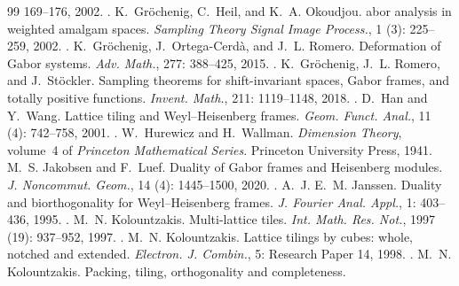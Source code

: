 \documentclass[11pt,reqno]{amsart}
\numberwithin{equation}{section}
\theoremstyle{definition}
\theoremstyle{remark}
\begin{document}
\begin{thebibliography}{99}
  169--176, 2002.
\newblock {}.
K.~Gr\"ochenig, C.~Heil, and K.~A. Okoudjou.
abor analysis in weighted amalgam spaces.
\newblock \emph{Sampling Theory Signal Image Process.}, 1 (3): 225--259, 2002.
\newblock {}.
K.~Gr\"ochenig, J.~Ortega-Cerd\`a, and J.~L. Romero.
\newblock Deformation of {G}abor systems.
\newblock \emph{Adv. Math.}, 277: 388--425, 2015.
\newblock {}.
K.~Gr\"ochenig, J.~L. Romero, and J.~St\"ockler.
\newblock Sampling theorems for shift-invariant spaces, {G}abor frames, and totally positive functions.
\newblock \emph{Invent. Math.}, 211: 1119--1148, 2018.
\newblock {}.
D.~Han and Y.~Wang.
\newblock Lattice tiling and {W}eyl--{H}eisenberg frames.
\newblock \emph{Geom. Funct. Anal.}, 11 (4): 742--758, 2001.
\newblock {}.
W.~Hurewicz and H.~Wallman.
\newblock \emph{Dimension Theory}, volume~4 of \emph{Princeton Mathematical
  Series}.
\newblock Princeton University Press, 1941.
M.~S. Jakobsen and F.~Luef.
\newblock Duality of {G}abor frames and {H}eisenberg modules.
\newblock \emph{J. Noncommut. Geom.}, 14 (4): 1445--1500,
  2020.
\newblock {}.
A.~J. E.~M. Janssen.
\newblock Duality and biorthogonality for {W}eyl--{H}eisenberg frames.
\newblock \emph{J. Fourier Anal. Appl.}, 1: 403--436, 1995.
\newblock {}.
M.~N. Kolountzakis.
\newblock Multi-lattice tiles.
\newblock \emph{Int. Math. Res. Not.}, 1997 (19): 937--952, 1997.
\newblock {}.
M.~N. Kolountzakis.
\newblock Lattice tilings by cubes: whole, notched and extended.
\newblock \emph{Electron. J. Combin.}, 5: Research Paper 14, 1998.
\newblock {}.
M.~N. Kolountzakis.
\newblock Packing, tiling, orthogonality and completeness.

\end{thebibliography}
\end{document}
